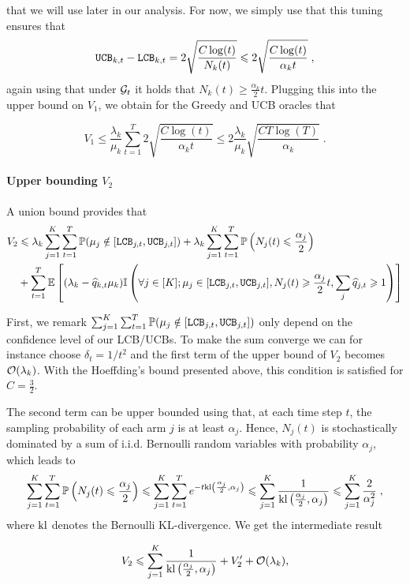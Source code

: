 that we will use later in our analysis. For now, we simply use that this tuning ensures that \[\texttt{UCB}_{k,t}-\texttt{LCB}_{k, t} = 2\sqrt{\frac{C\log(t)}{N_k(t)}} \leqslant 2\sqrt{\frac{C\log(t)}{\alpha_k t}} \;, \]
again using that under $\mathcal{G}_t$ it holds that $N_k(t)\geq \frac{\alpha_k}{2}t$. Plugging this into the upper bound on $V_1$, we obtain for the Greedy and UCB oracles that 

\[V_1 \leq \frac{\lambda_k}{\mu_k} \sum_{t=1}^T 2 \sqrt{\frac{C\log(t)}{\alpha_k t}} \leq 2\frac{\lambda_k}{\mu_k}\sqrt{\frac{CT\log(T)}{\alpha_k}}\;. \] 

\paragraph{Upper bounding $V_2$} A union bound provides that 
\begin{align*}
V_2 & \leqslant \lambda_k \sum_{j=1}^K \sum_{t=1}^T \mathbb{P}(\mu_j \notin [\texttt{LCB}_{j, t}, \texttt{UCB}_{j, t}])  + \lambda_k \sum_{j=1}^K \sum_{t=1}^T\mathbb{P}\left(N_j(t)\leqslant \frac{\alpha_j}{2}\right) \\
&+ \sum_{t=1}^T \mathbb{E}\left[(\lambda_k - \widehat{q}_{k,t}\mu_k)\mathbb{I}\left(\forall j \in [K]; \mu_j \in [\texttt{LCB}_{j, t}, \texttt{UCB}_{j, t}], N_j(t)\geqslant \frac{\alpha_j}{2}t,  \sum_j \widehat{q}_{j,t} \geqslant 1\right)\right] 
\end{align*}
 
First, we remark $\sum_{j=1}^K \sum_{t=1}^T \mathbb{P}(\mu_j \notin [\texttt{LCB}_{j, t}, \texttt{UCB}_{j, t}])$ only depend on the confidence level of our LCB/UCBs. To make the sum converge we can for instance choose $\delta_t = 1/t^2$ and the first term of the upper bound of $V_2$ becomes $\mathcal{O}(\lambda_k)$. With the Hoeffding's bound presented above, this condition is satisfied for $C=\frac{3}{2}$.

The second term can be upper bounded using that, at each time step $t$, the sampling probability of each arm $j$ is at least $\alpha_j$. Hence, $N_j(t)$ is stochastically dominated by a sum of i.i.d. Bernoulli random variables with probability $\alpha_j$, which leads to 
\begin{align*}
\sum_{j=1}^K \sum_{t=1}^T\mathbb{P}\left(N_j(t)\leqslant \frac{\alpha_j}{2}\right) \leqslant \sum_{j=1}^K \sum_{t=1}^T e^{-t \text{\normalfont kl}\left(\frac{\alpha_j}{2}, \alpha_j\right)} \leqslant  \sum_{j=1}^K   \frac{1}{\text{\normalfont kl}\left(\frac{\alpha_j}{2}, \alpha_j\right)} \leqslant \sum_{j=1}^K\frac{2}{\alpha_j^2}\;,
\end{align*}
where $\text{\normalfont kl}$ denotes the Bernoulli KL-divergence. We get the intermediate result 

\[V_2 \leqslant \sum_{j=1}^K   \frac{1}{\text{\normalfont kl}\left(\frac{\alpha_j}{2}, \alpha_j\right)} + V_2'+ \mathcal{O}(\lambda_k),  \]

